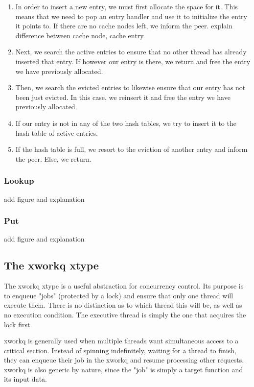 \begin{enumerate}
	\item In order to insert a new entry, we must first allocate the space 
		for it. This means that we need to pop an entry handler and use 
		it to initialize the entry it points to. If there are no cache 
		nodes left, we inform the peer.
		\fixme explain difference between cache node, cache entry
	\item Next, we search the active entries to ensure that no other thread 
		has already inserted that entry. If however our entry is there, we 
		return and free the entry we have previously allocated.
	\item Then, we search the evicted entries to likewise ensure that our entry 
		has not been just evicted. In this case, we reinsert it and free the 
		entry we have previously allocated.
	\item If our entry is not in any of the two hash tables, we try to insert 
		it to the hash table of active entries.
	\item If the hash table is full, we resort to the eviction of another entry 
		and inform the peer. Else, we return.
\end{enumerate}

\subsubsection{Lookup}

\fixme add figure and explanation

\subsubsection{Put}

\fixme add figure and explanation

\subsection{The xworkq xtype}\label{sec:xworkq-design}

The xworkq xtype is a useful abstraction for concurrency control. Its purpose 
is to enqueue "jobs" (protected by a lock) and ensure that only one thread will 
execute them. There is no distinction as to which thread this will be, as well 
as no execution condition. The executive thread is simply the one that acquires 
the lock first.

xworkq is generally used when multiple threads want simultaneous access to a 
critical section. Instead of spinning indefinitely, waiting for a thread to 
finish, they can enqueue their job in the xworkq and resume processing other 
requests. xworkq is also generic by nature, since the "job" is simply a target 
function and its input data.

